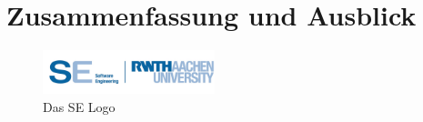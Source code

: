 \chapter{Zusammenfassung und Ausblick}

\begin{figure}[ht!]
\begin{center}\includegraphics[width=5cm]{src/pic/logo}\end{center}
\caption{Das SE Logo}
\label{Logo}
\end{figure}

\cleardoublepage
